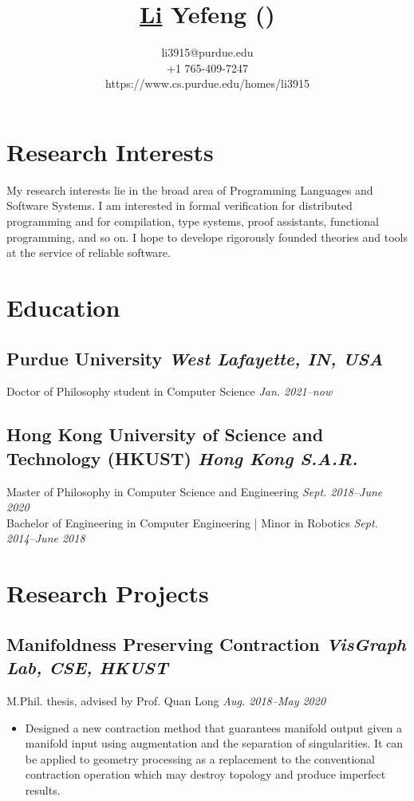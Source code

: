 \documentclass[11pt]{article}
\title{
  \bfseries\underline{Li} Yefeng
  (\raisebox{-1pt}{\Large\zhfont 李烨锋})}
\author{
  \normalsize\sffamily li3915@purdue.edu \\
  \normalsize\sffamily +1 765-409-7247 \\
  \normalsize\sffamily https://www.cs.purdue.edu/homes/li3915}
\newcommand{\subsec}[2]{\subsection*{#1 \hfill {\normalfont\itshape #2}}}
\newcommand{\subsecdesc}[2]{{#1 \hfill \itshape #2}}
\begin{document}
\maketitle

\section*{Research Interests} %

  My research interests lie in the broad area of Programming Languages and
  Software Systems. I am interested in formal verification for distributed
  programming and for compilation, type systems, proof assistants, functional
  programming, and so on. I hope to develope rigorously founded theories and
  tools at the service of reliable software.

\section*{Education} %

  \subsec{Purdue University}
         {West Lafayette, IN, USA}
  \subsecdesc{Doctor of Philosophy student in Computer Science}
             {Jan. 2021--now}

  \subsec{Hong Kong University of Science and Technology (HKUST)}
         {Hong Kong S.A.R.}
  \subsecdesc{Master of Philosophy in Computer Science and Engineering}
             {Sept. 2018--June 2020} \\
  \subsecdesc{Bachelor of Engineering in Computer Engineering | Minor in Robotics}
             {Sept. 2014--June 2018}

\section*{Research Projects} %

  \subsec{Manifoldness Preserving Contraction}
         {VisGraph Lab, CSE, HKUST}
  \subsecdesc{M.Phil. thesis, advised by Prof. Quan Long}
             {Aug. 2018--May 2020}
  \begin{itemize}
    \item Designed a new contraction method that guarantees manifold output
      given a manifold input using augmentation and the separation of
      singularities. It can be applied to geometry processing as a replacement
      to the conventional contraction operation which may destroy topology and
      produce imperfect results.
  \end{itemize}
\end{document}
